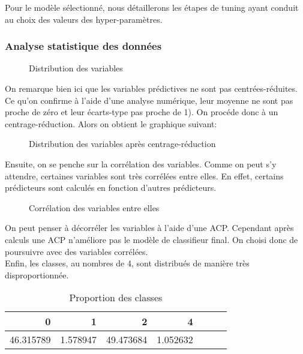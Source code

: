 \documentclass{article}
\begin{document}
Pour le modèle sélectionné, nous détaillerons les étapes de tuning ayant conduit au choix des valeurs des hyper-paramètres.


\subsubsection{Analyse statistique des données}

\begin{figure}[!h]
  \centering{}
 \captionsetup{justification=centering}
    \caption{Distribution des variables}
\end{figure}

On remarque bien ici que les variables prédictives ne sont pas centrées-réduites. Ce qu'on confirme à l'aide d'une analyse numérique, leur moyenne ne sont pas proche de zéro et leur écarts-type pas proche de 1). On procéde donc à un centrage-réduction.
Alors on obtient le graphique suivant:

\begin{figure}[H]
  \centering{}
 \captionsetup{justification=centering}
    \caption{Distribution des variables après centrage-réduction}
\end{figure}

Ensuite, on se penche sur la corrélation des variables. Comme on peut s'y attendre, certaines variables sont très corrélées entre elles. En effet, certains prédicteurs sont calculés en fonction d'autres prédicteurs.

\begin{figure}[H]
  \centering{}
 \captionsetup{justification=centering}
    \caption{Corrélation des variables entre elles}
\end{figure}

On peut penser à décorréler les variables à l'aide d'une ACP. Cependant après calculs une ACP n'améliore pas le modèle de classifieur final. On choisi donc de poursuivre avec des variables corrélées.\\

Enfin, les classes, au nombres de 4, sont distribués de manière très disproportionnée.

\begin{table}[ht]
\centering
\captionsetup{justification=centering}
    \caption{Proportion des classes}
\begin{tabular}{rrrrrrr}
  \hline
 0 & 1 & 2 & 4 \\ 
  \hline
46.315789 & 1.578947 & 49.473684 &  1.052632   \\
 
\end{tabular}
\end{table}
\end{document}
